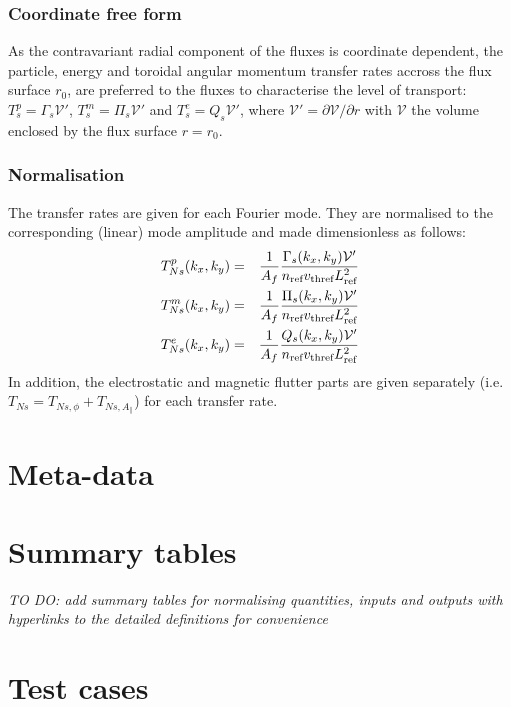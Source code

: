 \documentclass[fleqn]{report}
\begin{document}
\subsection{Coordinate free form}
As the contravariant radial component of the fluxes is coordinate dependent, the particle, energy and toroidal angular momentum transfer rates accross the flux surface $r_0$, are preferred to the fluxes to characterise the level of transport: $T_s^p=\Gamma_s \mathcal{V}'$, $T_s^m=\Pi_s\mathcal{V}'$ and $T_s^e=Q_s\mathcal{V}'$, where $\mathcal{V}'=\partial\mathcal{V}/\partial r$ with  $\mathcal{V}$ the volume enclosed by the flux surface $r=r_0$. 

\subsection{Normalisation}
The transfer rates are given for each Fourier mode. They are normalised to the corresponding (linear) mode amplitude and made dimensionless as follows:
\begin{eqnarray}
 T^p_{Ns}(k_x,k_y) &=& \frac{1}{A_f}\frac{\Gamma_s(k_x,k_y)\mathcal{V}'}{n_{\textrm{ref}} v_\textrm{thref} L_{\textrm{ref}}^2}\\
 T^m_{Ns}(k_x,k_y) &=& \frac{1}{A_f}\frac{\Pi_s(k_x,k_y)\mathcal{V}'}{n_{\textrm{ref}} v_\textrm{thref} L_{\textrm{ref}}^2}\\
 T^e_{Ns}(k_x,k_y) &=& \frac{1}{A_f}\frac{Q_s(k_x,k_y)\mathcal{V}'}{n_{\textrm{ref}} v_\textrm{thref} L_{\textrm{ref}}^2}
\end{eqnarray}
In addition, the electrostatic and magnetic flutter parts are given separately (i.e. $T_{Ns}=T_{Ns,\phi}+T_{Ns,A_\parallel}$) for each transfer rate. 




\chapter{Meta-data}

\chapter{Summary tables}

\textit{TO DO: add summary tables for normalising quantities, inputs and outputs with hyperlinks to the detailed definitions for convenience}

\chapter{Test cases}
\end{document}
